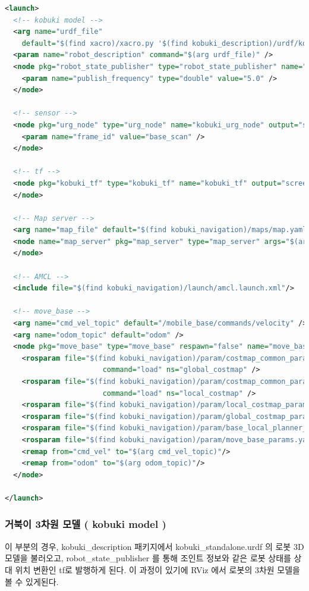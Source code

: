 \vspace{\baselineskip}
\begin{lstlisting}[language=XML]
<launch>
  <!-- kobuki model -->
  <arg name="urdf_file" 
    default="$(find xacro)/xacro.py '$(find kobuki_description)/urdf/kobuki_standalone.urdf.xacro'" />
  <param name="robot_description" command="$(arg urdf_file)" />
  <node pkg="robot_state_publisher" type="robot_state_publisher" name="robot_state_publisher" output="screen">
    <param name="publish_frequency" type="double" value="5.0" />
  </node>

  <!-- sensor -->
  <node pkg="urg_node" type="urg_node" name="kobuki_urg_node" output="screen">
    <param name="frame_id" value="base_scan" />
  </node>

  <!-- tf -->
  <node pkg="kobuki_tf" type="kobuki_tf" name="kobuki_tf" output="screen">
  </node>

  <!-- Map server -->
  <arg name="map_file" default="$(find kobuki_navigation)/maps/map.yaml"/>
  <node name="map_server" pkg="map_server" type="map_server" args="$(arg map_file)">
  </node>

  <!-- AMCL -->
  <include file="$(find kobuki_navigation)/launch/amcl.launch.xml"/>

  <!-- move_base -->  
  <arg name="cmd_vel_topic" default="/mobile_base/commands/velocity" />
  <arg name="odom_topic" default="odom" />
  <node pkg="move_base" type="move_base" respawn="false" name="move_base" output="screen">
    <rosparam file="$(find kobuki_navigation)/param/costmap_common_params.yaml" 
                       command="load" ns="global_costmap" />
    <rosparam file="$(find kobuki_navigation)/param/costmap_common_params.yaml"
                       command="load" ns="local_costmap" />
    <rosparam file="$(find kobuki_navigation)/param/local_costmap_params.yaml" command="load" />
    <rosparam file="$(find kobuki_navigation)/param/global_costmap_params.yaml" command="load" />
    <rosparam file="$(find kobuki_navigation)/param/base_local_planner_params.yaml" command="load" />
    <rosparam file="$(find kobuki_navigation)/param/move_base_params.yaml" command="load" />
    <remap from="cmd_vel" to="$(arg cmd_vel_topic)"/>
    <remap from="odom" to="$(arg odom_topic)"/>
  </node>

</launch>
\end{lstlisting}

\subsubsection{거북이 3차원 모델 ( kobuki model )}
이 부분의 경우, kobuki\_description 패키지에서 kobuki\_standalone.urdf 의 로봇 3D 모델을 불러오고, robot\_state\_publisher 를 통해 조인트 정보와 같은 로봇 상태를 상대 위치 변환인 tf로 발행하게 된다. 이 과정이 있기에 RViz 에서 로봇의 3차원 모델을 볼 수 있게된다.


